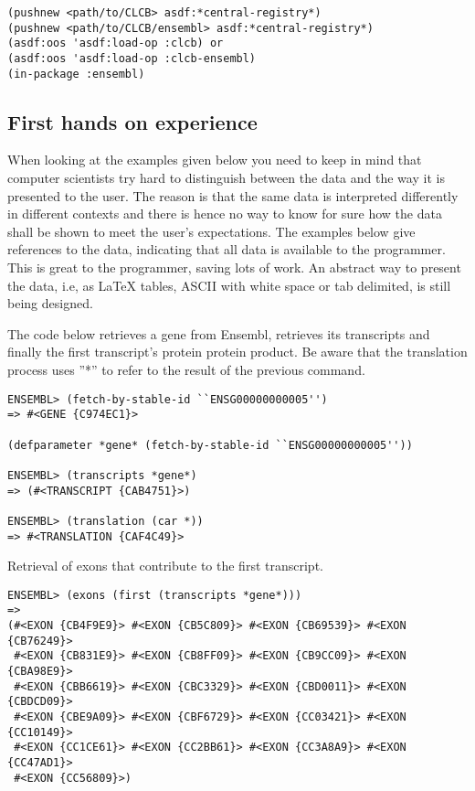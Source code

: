 \documentclass{book}
\begin{document}
\lstset{language=lisp}
\begin{lstlisting}
(pushnew <path/to/CLCB> asdf:*central-registry*)
(pushnew <path/to/CLCB/ensembl> asdf:*central-registry*)
(asdf:oos 'asdf:load-op :clcb) or
(asdf:oos 'asdf:load-op :clcb-ensembl)
(in-package :ensembl)
\end{lstlisting}

\subsection{First hands on experience}

When looking at the examples given below you need to keep in mind that
computer scientists try hard to distinguish between the data and the
way it is presented to the user. The reason is that the same data
is interpreted differently in different contexts and there is hence
no way to know for sure how the data shall be shown to meet the user's
expectations. The examples below give references to the data, indicating
that all data is available to the programmer. This is great to the
programmer, saving lots of work. An abstract way to present the data,
i.e, as LaTeX tables, ASCII with white space or tab delimited, is still
being designed.

The code below retrieves a gene from Ensembl, retrieves its transcripts and finally the first transcript's protein protein product. Be aware that the translation process uses ''*'' to refer to the result of the previous command.

\begin{lstlisting}
ENSEMBL> (fetch-by-stable-id ``ENSG00000000005'')
=> #<GENE {C974EC1}>

(defparameter *gene* (fetch-by-stable-id ``ENSG00000000005''))

ENSEMBL> (transcripts *gene*)
=> (#<TRANSCRIPT {CAB4751}>)

ENSEMBL> (translation (car *))
=> #<TRANSLATION {CAF4C49}>
\end{lstlisting}

Retrieval of exons that contribute to the first transcript.
\begin{lstlisting}
ENSEMBL> (exons (first (transcripts *gene*)))
=> 
(#<EXON {CB4F9E9}> #<EXON {CB5C809}> #<EXON {CB69539}> #<EXON {CB76249}>
 #<EXON {CB831E9}> #<EXON {CB8FF09}> #<EXON {CB9CC09}> #<EXON {CBA98E9}>
 #<EXON {CBB6619}> #<EXON {CBC3329}> #<EXON {CBD0011}> #<EXON {CBDCD09}>
 #<EXON {CBE9A09}> #<EXON {CBF6729}> #<EXON {CC03421}> #<EXON {CC10149}>
 #<EXON {CC1CE61}> #<EXON {CC2BB61}> #<EXON {CC3A8A9}> #<EXON {CC47AD1}>
 #<EXON {CC56809}>)
\end{lstlisting}
\end{document}
